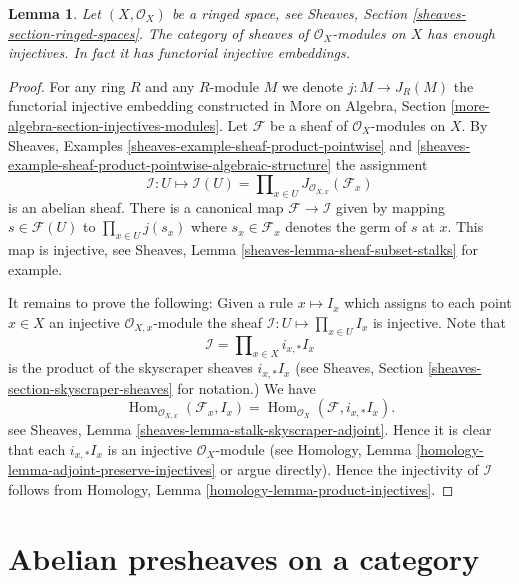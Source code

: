 \documentclass{stacks-project}
\theoremstyle{plain}
\newtheorem{lemma}[subsection]{Lemma}
\theoremstyle{definition}
\theoremstyle{remark}
\numberwithin{equation}{subsection}
\def\Hom{\mathop{\mathrm{Hom}}\nolimits}
\begin{document}
\begin{lemma}
\label{lemma-sheaves-modules-space}
Let $(X, \mathcal{O}_X)$ be a ringed space, see
Sheaves, Section \ref{sheaves-section-ringed-spaces}.
The category of sheaves of $\mathcal{O}_X$-modules on $X$
has enough injectives. In fact it has functorial injective embeddings.
\end{lemma}

\begin{proof}
For any ring $R$ and any $R$-module $M$ we denote
$j : M \to J_R(M)$ the functorial
injective embedding constructed in
More on Algebra, Section \ref{more-algebra-section-injectives-modules}.
Let $\mathcal{F}$ be a sheaf of $\mathcal{O}_X$-modules on $X$.
By Sheaves, Examples \ref{sheaves-example-sheaf-product-pointwise}
and \ref{sheaves-example-sheaf-product-pointwise-algebraic-structure}
the assignment
$$
\mathcal{I} : U \mapsto
\mathcal{I}(U) = \prod\nolimits_{x\in U} J_{\mathcal{O}_{X, x}}(\mathcal{F}_x)
$$
is an abelian sheaf.
There is a canonical map $\mathcal{F} \to \mathcal{I}$
given by mapping $s \in \mathcal{F}(U)$ to $\prod_{x \in U} j(s_x)$
where $s_x \in \mathcal{F}_x$ denotes the germ of $s$ at $x$.
This map is injective, see
Sheaves, Lemma \ref{sheaves-lemma-sheaf-subset-stalks}
for example.

\medskip\noindent
It remains to prove the following: Given a rule
$x \mapsto I_x$ which assigns to each point $x \in X$ an injective
$\mathcal{O}_{X, x}$-module
the sheaf $\mathcal{I} : U \mapsto \prod_{x \in U} I_x$
is injective. Note that
$$
\mathcal{I} = \prod\nolimits_{x \in X} i_{x, *}I_x
$$
is the product of the skyscraper sheaves $i_{x, *}I_x$ (see
Sheaves, Section \ref{sheaves-section-skyscraper-sheaves} for notation.)
We have
$$
\Hom_{\mathcal{O}_{X, x}}(\mathcal{F}_x, I_x)
=
\Hom_{\mathcal{O}_X}(\mathcal{F}, i_{x, *}I_x).
$$
see Sheaves, Lemma \ref{sheaves-lemma-stalk-skyscraper-adjoint}. Hence it is
clear that each $i_{x, *}I_x$ is an injective $\mathcal{O}_X$-module
(see Homology, Lemma \ref{homology-lemma-adjoint-preserve-injectives} or argue
directly). Hence the injectivity of $\mathcal{I}$ follows from
Homology, Lemma \ref{homology-lemma-product-injectives}.
\end{proof}













\section{Abelian presheaves on a category}
\label{section-injectives-presheaves}
\end{document}
